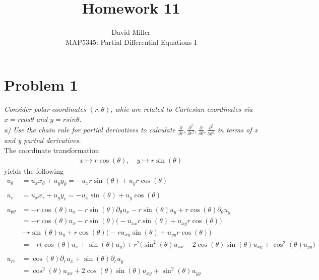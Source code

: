 \documentclass[12pt]{article}
\theoremstyle{remark}
\begin{document}
 
\title{Homework 11}
\author{David Miller \\ 
MAP5345: Partial Differential Equations I} 
 
\maketitle

\section*{Problem 1}

\textit{Consider polar coordinates $(r,\theta)$, whic are related to Cartesian coordinates via $x = rcos\theta$ and $y = rsin\theta$.} \\

\textit{a) Use the chain rule for partial derivatives to calculate $\frac{\partial}{\partial r}, \frac{\partial^2}{\partial r^2}, \frac{\partial}{\partial\theta}, \frac{\partial^2}{\partial\theta^2}$ in terms of x and y partial derivatives.} \\

The coordinate transformation
\begin{align*}
	x \mapsto r\cos(\theta), \quad y \mapsto r\sin(\theta)
\end{align*}
yields the following
\begin{align*}
u_\theta & = u_xx_\theta + u_yy_\theta = -u_xr\sin(\theta) + u_yr\cos(\theta)
\\ \\
u_r & = u_xx_r + u_yy_r = -u_x\sin(\theta) + u_y\cos(\theta)
\\ \\
u_{\theta\theta} & = -r\cos(\theta)u_x - r\sin(\theta)\partial_\theta u_x - r\sin(\theta)u_y + r\cos(\theta)\partial_\theta u_y \\
& = -r\cos(\theta)u_x - r\sin(\theta)\bigg(-u_{xx}r\sin(\theta) + u_{xy}r\cos(\theta)\bigg) \\ & - r\sin(\theta)u_y + r\cos(\theta)\bigg(-ru_{xy}\sin(\theta) + u_{yy}r\cos(\theta)\bigg) \\ 
& = -r\bigg(\cos(\theta)u_x + \sin(\theta)u_y\bigg) + r^2\bigg(\sin^2(\theta)u_{xx} -2\cos(\theta)\sin(\theta)u_{xy} + \cos^2(\theta)u_{yy}\bigg) 
\\ \\
u_{rr} & = \cos(\theta)\partial_ru_x + \sin(\theta)\partial_ru_y \\
& = \cos^2(\theta)u_{xx} + 2\cos(\theta)\sin(\theta)u_{xy} + \sin^2(\theta)u_{yy}
\end{align*}
\end{document}
